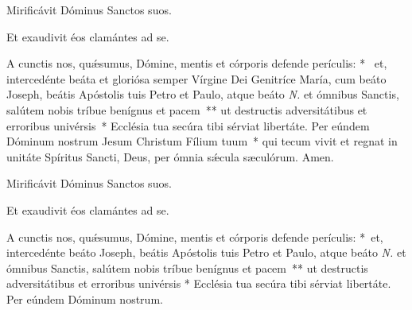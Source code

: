\vv Mirificávit Dóminus Sanctos suos.

\rr Et exaudivit éos clamántes ad se.

\oratio

\lettrine{A}{} cunctis nos, quǽsumus, Dómine, mentis et córporis defende perículis: \nolinebreak[4]*~ et, intercedénte beáta et gloriósa semper Vírgine Dei Genitríce María, cum beáto Joseph, beátis Apóstolis tuis Petro et Paulo, atque beáto \textit{N.} et ómnibus Sanctis, salútem nobis tríbue benígnus et pacem~** ut destructis adversitátibus et erroribus univérsis~* Ecclésia tua secúra tibi sérviat libertáte. Per eúndem Dóminum nostrum Jesum Christum Fílium tuum~* qui tecum vivit et regnat in unitáte Spíritus Sancti, Deus, per ómnia sǽcula sæculórum. \rr Amen.



\vv Mirificávit Dóminus Sanctos suos.

\rr Et exaudivit éos clamántes ad se.

\oratio

\lettrine{A}{} cunctis nos, quǽsumus, Dómine, mentis et córporis defende perículis: \nolinebreak[4]*~et, intercedénte beáto Joseph, beátis Apóstolis tuis Petro et Paulo, atque beáto \textit{N.} et ómnibus Sanctis, salútem nobis tríbue benígnus et pacem~** ut destructis adversitátibus et erroribus univérsis * Ecclésia tua secúra tibi sérviat libertáte. Per eúndem Dóminum nostrum.